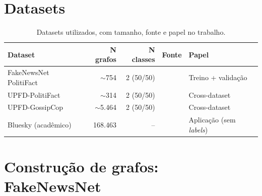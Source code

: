 \section{Datasets}
\label{sec:datasets}


\begin{table}[H]\centering
\caption{Datasets utilizados, com tamanho, fonte e papel no trabalho.}
\label{tab:datasets}
\small
\begin{tabular}{lrrll}
\toprule
\textbf{Dataset} & \textbf{N grafos} & \textbf{N classes} & \textbf{Fonte} & \textbf{Papel} \\
\midrule
FakeNewsNet PolitiFact   & $\sim$754   & 2 (50/50)   & \cite{shu2020fakenewsnet}      & Treino + valida\c{c}\~ao \\
UPFD-PolitiFact          & $\sim$314   & 2 (50/50)   & \cite{dou2021upfd}             & Cross-dataset \\
UPFD-GossipCop           & $\sim$5{.}464 & 2 (50/50) & \cite{dou2021upfd}             & Cross-dataset \\
Bluesky (acad\^emico)    & 168{.}463   & --          & \cite{failla2024bluesky}       & Aplica\c{c}\~ao (sem \emph{labels}) \\
\bottomrule
\end{tabular}
\end{table}


\section{Constru\c{c}\~ao de grafos: FakeNewsNet}
\label{sec:construcao_fnn}


